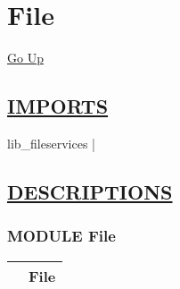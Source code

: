 \chapter*{\color{headfile}
File
}
\hypertarget{ecldoc:toc:File}{}
\hyperlink{ecldoc:toc:root}{Go Up}

\section*{\underline{\textsf{IMPORTS}}}
\begin{doublespace}
{\large
lib\_fileservices |
}
\end{doublespace}

\section*{\underline{\textsf{DESCRIPTIONS}}}
\subsection*{\textsf{\colorbox{headtoc}{\color{white} MODULE}
File}}

\hypertarget{ecldoc:File}{}

{\renewcommand{\arraystretch}{1.5}
\begin{tabularx}{\textwidth}{|>{\raggedright\arraybackslash}l|X|}
\hline
\hspace{0pt}\mytexttt{\color{red} } & \textbf{File} \\
\hline
\end{tabularx}
}

\par


